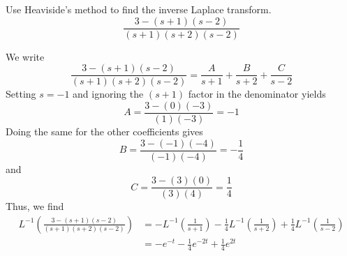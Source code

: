 \documentclass[11pt, titlepage]{article}
\begin{document}
    \begin{problem}[Trench 8.2.3a]
        Use Heaviside's method to find the inverse Laplace transform.
        \[
            \frac{3 - (s + 1)(s - 2)}{(s + 1)(s + 2)(s - 2)}
        \]
    \end{problem}

    \begin{solution}
        We write
        \[
            \frac{3 - (s+1) (s-2)}{(s+1) (s+2) (s-2)} = \frac{A}{s+1} +
            \frac{B}{s+2} + \frac{C}{s-2}
        \] 
        Setting $s = -1$ and ignoring the $(s+1)$ factor in the denominator
        yields
        \[
            A = \frac{3 - (0)(-3)}{(1)(-3)} = -1
        \] 
        Doing the same for the other coefficients gives
        \[
            B = \frac{3 - (-1)(-4)}{(-1)(-4)} = - \frac{1}{4}
        \] 
        and
        \[
            C = \frac{3 - (3)(0)}{(3)(4)} = \frac{1}{4}
        \] 
        Thus, we find
        \begin{align*}
            L^{-1}\left(\frac{3 - (s + 1)(s - 2)}{(s + 1)(s + 2)(s - 2)}\right)
            &= 
            - L^{-1} \left(\frac{1}{s+1}\right) - \frac{1}{4} L^{-1}
            \left(\frac{1}{s+2}\right) + \frac{1}{4} L^{-1}
            \left(\frac{1}{s-2}\right) \\
            &= -e^{-t} - \frac{1}{4} e^{-2t} + \frac{1}{4} e^{2t}
        \end{align*}
    \end{solution}
\end{document}
